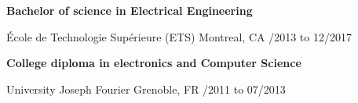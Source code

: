 \begin{textblock}{13.5}

			\centerline{\textbf{\large{Bachelor of science in Electrical Engineering }}}
			\'Ecole de Technologie Sup\'erieure (ETS) \textbullet{} Montreal, CA /2013 to 12/2017 \\

			\centerline{\textbf{\large{College diploma in electronics and Computer Science}}}
			University Joseph Fourier \textbullet{} Grenoble, FR /2011 to 07/2013 \\
	\end{textblock}

